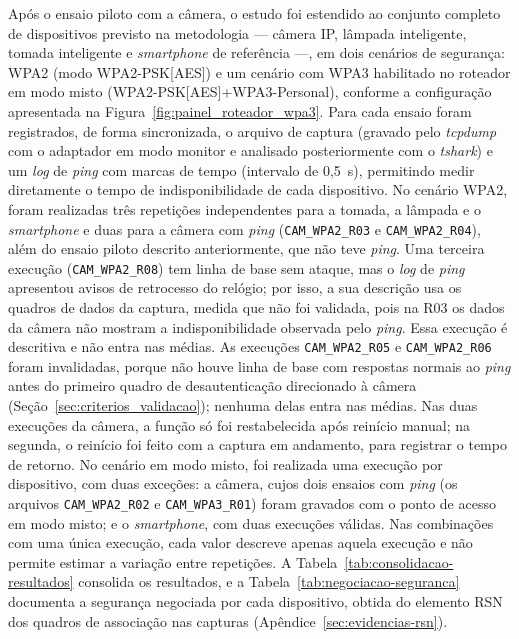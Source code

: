 Após o ensaio piloto com a câmera, o estudo foi estendido ao conjunto completo de dispositivos previsto na metodologia --- câmera IP, lâmpada inteligente, tomada inteligente e \textit{smartphone} de referência ---, em dois cenários de segurança: WPA2 (modo WPA2-PSK[AES]) e um cenário com WPA3 habilitado no roteador em modo misto (WPA2-PSK[AES]+WPA3-Personal), conforme a configuração apresentada na Figura~\ref{fig:painel_roteador_wpa3}. Para cada ensaio foram registrados, de forma sincronizada, o arquivo de captura (gravado pelo \textit{tcpdump} com o adaptador em modo monitor e analisado posteriormente com o \textit{tshark}) e um \textit{log} de \textit{ping} com marcas de tempo (intervalo de 0,5~s), permitindo medir diretamente o tempo de indisponibilidade de cada dispositivo. No cenário WPA2, foram realizadas três repetições independentes para a tomada, a lâmpada e o \textit{smartphone} e duas para a câmera com \textit{ping} (\texttt{CAM\_WPA2\_R03} e \texttt{CAM\_WPA2\_R04}), além do ensaio piloto descrito anteriormente, que não teve \textit{ping}. Uma terceira execução (\texttt{CAM\_WPA2\_R08}) tem linha de base sem ataque, mas o \textit{log} de \textit{ping} apresentou avisos de retrocesso do relógio; por isso, a sua descrição usa os quadros de dados da captura, medida que não foi validada, pois na R03 os dados da câmera não mostram a indisponibilidade observada pelo \textit{ping}. Essa execução é descritiva e não entra nas médias. As execuções \texttt{CAM\_WPA2\_R05} e \texttt{CAM\_WPA2\_R06} foram invalidadas, porque não houve linha de base com respostas normais ao \textit{ping} antes do primeiro quadro de desautenticação direcionado à câmera (Seção~\ref{sec:criterios_validacao}); nenhuma delas entra nas médias. Nas duas execuções da câmera, a função só foi restabelecida após reinício manual; na segunda, o reinício foi feito com a captura em andamento, para registrar o tempo de retorno. No cenário em modo misto, foi realizada uma execução por dispositivo, com duas exceções: a câmera, cujos dois ensaios com \textit{ping} (os arquivos \texttt{CAM\_WPA2\_R02} e \texttt{CAM\_WPA3\_R01}) foram gravados com o ponto de acesso em modo misto; e o \textit{smartphone}, com duas execuções válidas. Nas combinações com uma única execução, cada valor descreve apenas aquela execução e não permite estimar a variação entre repetições. A Tabela~\ref{tab:consolidacao-resultados} consolida os resultados, e a Tabela~\ref{tab:negociacao-seguranca} documenta a segurança negociada por cada dispositivo, obtida do elemento RSN dos quadros de associação nas capturas (Apêndice~\ref{sec:evidencias-rsn}).

